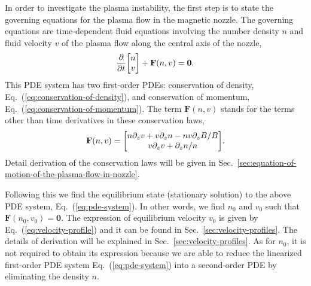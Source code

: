 In order to investigate the plasma instability, the first step is to state the governing equations for the plasma flow in the magnetic nozzle. The governing equations are time-dependent fluid equations involving the number density $n$ and fluid velocity $v$ of the plasma flow along the central axis of the nozzle,
\begin{equation}
	\pdv{t}\mqty[n\\ v] + \mathbf{F}(n,v) = \mathbf{0}.
	\label{eq:pde-system}
\end{equation}
This PDE system has two first-order PDEs: conservation of density, Eq.~(\ref{eq:conservation-of-density}), and conservation of momentum, Eq.~(\ref{eq:conservation-of-momentum}). The term $\mathbf{F}(n,v)$ stands for the terms other than time derivatives in these conservation laws,
\begin{equation}
	\mathbf{F}(n,v) = \mqty[n\partial_zv + v\partial_zn - nv\partial_zB/B \\ v\partial_zv + \partial_zn/n].
\end{equation}
Detail derivation of the conservation laws will be given in Sec.~\ref{sec:equation-of-motion-of-the-plasma-flow-in-nozzle}.

Following this we find the equilibrium state (stationary solution) to the above PDE system, Eq.~(\ref{eq:pde-system}). In other words, we find $n_0$ and $v_0$ such that $\mathbf{F}(n_0,v_0)=\mathbf{0}$. The expression of equilibrium velocity $v_0$ is given by Eq.~(\ref{eq:velocity-profile}) and it can be found in Sec.~\ref{sec:velocity-profiles}. The details of derivation will be explained in Sec.~\ref{sec:velocity-profiles}. As for $n_0$, it is not required to obtain its expression because we are able to reduce the linearized first-order PDE system Eq.~(\ref{eq:pde-system}) into a second-order PDE by eliminating the density $n$.

